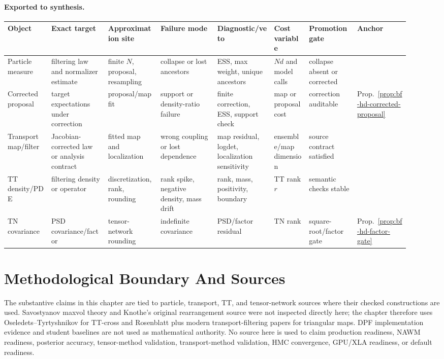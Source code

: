 \paragraph{Exported to synthesis.}
\begingroup
\scriptsize
\setlength{\tabcolsep}{2pt}
\begin{longtable}{@{}p{0.10\linewidth}p{0.13\linewidth}p{0.12\linewidth}p{0.13\linewidth}p{0.13\linewidth}p{0.08\linewidth}p{0.11\linewidth}p{0.12\linewidth}@{}}
\toprule
Object & Exact target & Approximation site & Failure mode & Diagnostic/veto &
Cost variable & Promotion gate & Anchor \\
\midrule
\endhead
Particle measure & filtering law and normalizer estimate & finite \(N\),
proposal, resampling & collapse or lost ancestors & ESS, max weight, unique
ancestors & \(Nd\) and model calls & collapse absent or corrected &
\citet{gordon1993novel,arulampalam2002tutorial,bengtsson2008curse,snyder2008obstacles} \\
Corrected proposal & target expectations under correction & proposal/map fit &
support or density-ratio failure & finite correction, ESS, support check & map
or proposal cost & correction auditable &
Prop.~\ref{prop:bf-hd-corrected-proposal} \\
Transport map/filter & Jacobian-corrected law or analysis contract & fitted map
and localization & wrong coupling or lost dependence & map residual, logdet,
localization sensitivity & ensemble/map dimension & source contract satisfied &
\citet{rosenblatt1952remarks,spantini2022coupling} \\
TT density/PDE & filtering density or operator & discretization, rank,
rounding & rank spike, negative density, mass drift & rank, mass, positivity,
boundary & TT rank \(r\) & semantic checks stable &
\citet{oseledets2011tt,li2019ttfiltering,fox2021grid,zhao2024ttsequential} \\
TN covariance & PSD covariance/factor & tensor-network rounding & indefinite
covariance & PSD/factor residual & TN rank & square-root/factor gate &
Prop.~\ref{prop:bf-hd-factor-gate} \\
\bottomrule
\end{longtable}
\endgroup

\section{Methodological Boundary And Sources}
\label{sec:bf-hd-ptt-boundary}

The substantive claims in this chapter are tied to particle, transport, TT, and
tensor-network sources where their checked constructions are used.  Savostyanov
maxvol theory and Knothe's original rearrangement source were not inspected
directly here; the chapter therefore uses Oseledets--Tyrtyshnikov for TT-cross
and Rosenblatt plus modern transport-filtering papers for triangular maps.
DPF implementation evidence and student baselines are not used as mathematical
authority.  No source here is used to claim production readiness, NAWM
readiness, posterior accuracy, tensor-method validation, transport-method
validation, HMC convergence, GPU/XLA readiness, or default readiness.

